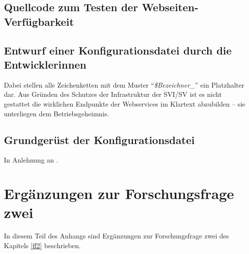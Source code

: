 \clearpage

\section{Quellcode zum Testen der Webseiten-Verfügbarkeit}


\clearpage

\section{Entwurf einer Konfigurationsdatei durch die Entwicklerinnen}


Dabei stellen alle Zeichenketten mit dem Muster \enquote{\textit{\$Bezeichner\_}} ein Platzhalter dar. Aus Gründen des Schutzes der Infrastruktur der \ac{SVI}/\ac{SV} ist es nicht gestattet die wirklichen Endpunkte der Webservices im Klartext abzubilden -- sie unterliegen dem Betriebsgeheimnis.

\clearpage

\section{Grundgerüst der Konfigurationsdatei}

In Anlehnung an \cite[][Application\,$\rightarrow$\,Deployments]{red_hat_inc_okd_2019}.

\par

 

%


\chapter{Ergänzungen zur Forschungsfrage zwei} \label{appendixFF2}
In diesem Teil des Anhangs sind Ergänzungen zur Forschungsfrage zwei des Kapitels \vref{ff2} beschrieben.

